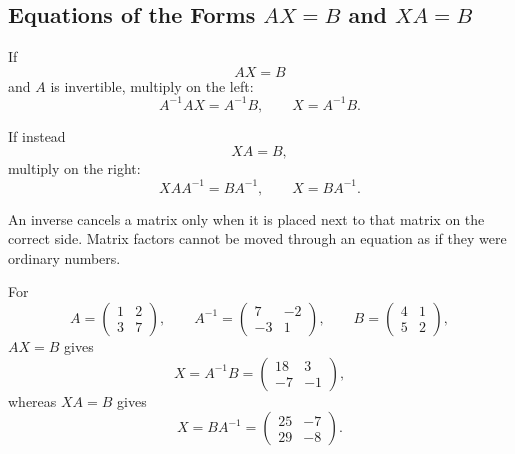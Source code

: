 \subsection{Equations of the Forms $AX=B$ and $XA=B$}

If
\[
AX=B
\]
and $A$ is invertible, multiply on the left:
\[
A^{-1}AX=A^{-1}B,
\qquad
\boxed{X=A^{-1}B}.
\]

If instead
\[
XA=B,
\]
multiply on the right:
\[
XAA^{-1}=BA^{-1},
\qquad
\boxed{X=BA^{-1}}.
\]

\begin{corebox}
An inverse cancels a matrix only when it is placed next to that matrix on the correct side. Matrix factors cannot be moved through an equation as if they were ordinary numbers.
\end{corebox}

\begin{examplebox}
For
\[
A=\begin{pmatrix}1&2\\3&7\end{pmatrix},
\qquad
A^{-1}=\begin{pmatrix}7&-2\\-3&1\end{pmatrix},
\qquad
B=\begin{pmatrix}4&1\\5&2\end{pmatrix},
\]
$AX=B$ gives
\[
X=A^{-1}B=\begin{pmatrix}18&3\\-7&-1\end{pmatrix},
\]
whereas $XA=B$ gives
\[
X=BA^{-1}=\begin{pmatrix}25&-7\\29&-8\end{pmatrix}.
\]
\end{examplebox}

